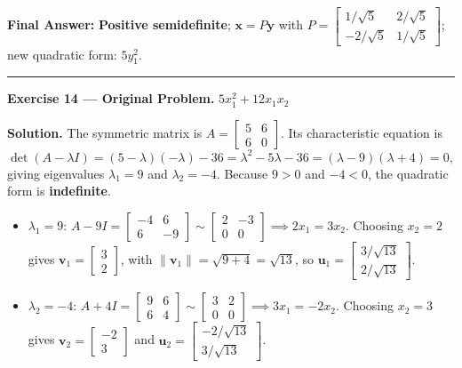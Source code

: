 \documentclass[11pt, letterpaper]{article}
\theoremstyle{definition}
\theoremstyle{remark}
\begin{document}
\textbf{Final Answer:} \textbf{Positive semidefinite}; $\mathbf{x} = P\mathbf{y}$ with $P = \begin{bmatrix} 1/\sqrt{5} & 2/\sqrt{5} \\ -2/\sqrt{5} & 1/\sqrt{5} \end{bmatrix}$; new quadratic form: $5y_1^2$.

\medskip
\hrule
\medskip

\textbf{Exercise 14 --- Original Problem.} $5x_1^2 + 12x_1x_2$

\textbf{Solution.}
The symmetric matrix is $A = \begin{bmatrix} 5 & 6 \\ 6 & 0 \end{bmatrix}$. Its characteristic equation is
\[
\det(A - \lambda I) = (5 - \lambda)(-\lambda) - 36 = \lambda^2 - 5\lambda - 36 = (\lambda - 9)(\lambda + 4) = 0,
\]
giving eigenvalues $\lambda_1 = 9$ and $\lambda_2 = -4$. Because $9 > 0$ and $-4 < 0$, the quadratic form is \textbf{indefinite}.
\begin{itemize}
    \item $\lambda_1 = 9$: $A - 9I = \begin{bmatrix} -4 & 6 \\ 6 & -9 \end{bmatrix} \sim \begin{bmatrix} 2 & -3 \\ 0 & 0 \end{bmatrix} \implies 2x_1 = 3x_2$. Choosing $x_2 = 2$ gives $\mathbf{v}_1 = \begin{bmatrix} 3 \\ 2 \end{bmatrix}$, with $\|\mathbf{v}_1\| = \sqrt{9 + 4} = \sqrt{13}$, so $\mathbf{u}_1 = \begin{bmatrix} 3/\sqrt{13} \\ 2/\sqrt{13} \end{bmatrix}$.
    \item $\lambda_2 = -4$: $A + 4I = \begin{bmatrix} 9 & 6 \\ 6 & 4 \end{bmatrix} \sim \begin{bmatrix} 3 & 2 \\ 0 & 0 \end{bmatrix} \implies 3x_1 = -2x_2$. Choosing $x_2 = 3$ gives $\mathbf{v}_2 = \begin{bmatrix} -2 \\ 3 \end{bmatrix}$ and $\mathbf{u}_2 = \begin{bmatrix} -2/\sqrt{13} \\ 3/\sqrt{13} \end{bmatrix}$.
\end{itemize}
\end{document}
